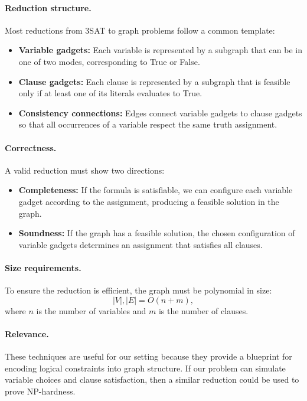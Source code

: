 \paragraph{Reduction structure.}
Most reductions from 3SAT to graph problems follow a common template:
\begin{itemize}
    \item \textbf{Variable gadgets:} Each variable is represented by a subgraph
    that can be in one of two modes, corresponding to True or False.
    \item \textbf{Clause gadgets:} Each clause is represented by a subgraph that
    is feasible only if at least one of its literals evaluates to True.
    \item \textbf{Consistency connections:} Edges connect variable gadgets to
    clause gadgets so that all occurrences of a variable respect the same
    truth assignment.
\end{itemize}

\paragraph{Correctness.}
A valid reduction must show two directions:
\begin{itemize}
    \item \textbf{Completeness:} If the formula is satisfiable, we can configure
    each variable gadget according to the assignment, producing a feasible
    solution in the graph.
    \item \textbf{Soundness:} If the graph has a feasible solution, the chosen
    configuration of variable gadgets determines an assignment that satisfies
    all clauses.
\end{itemize}

\paragraph{Size requirements.}
To ensure the reduction is efficient, the graph must be polynomial in size:
\[
|V|, |E| = O(n + m),
\]
where $n$ is the number of variables and $m$ is the number of clauses.

\paragraph{Relevance.}
These techniques are useful for our setting because they provide a blueprint for
encoding logical constraints into graph structure. If our problem can simulate
variable choices and clause satisfaction, then a similar reduction could be
used to prove NP-hardness.

